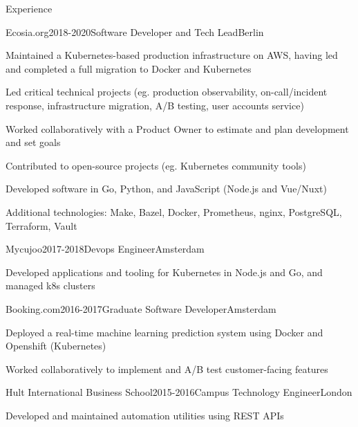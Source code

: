 \documentclass{resume} %
\begin{document}
\begin{rSection}{Experience}
\begin{rSubsection}{{Ecosia.org}}{2018-2020}{Software Developer and Tech Lead}{Berlin}
    \item Maintained a Kubernetes-based production infrastructure on AWS, having led and completed a full migration to Docker and Kubernetes
    \item Led critical technical projects (eg. production observability, on-call/incident response, infrastructure migration, A/B testing, user accounts service)
    \item Worked collaboratively with a Product Owner to estimate and plan development and set goals
    \item Contributed to open-source projects (eg. Kubernetes community tools)
    \item Developed software in Go, Python, and JavaScript (Node.js and Vue/Nuxt)
    \item Additional technologies: Make, Bazel, Docker, Prometheus, nginx, PostgreSQL, Terraform, Vault
\end{rSubsection}

\begin{rSubsection}{{Mycujoo}}{2017-2018}{Devops Engineer}{Amsterdam}
    \item Developed applications and tooling for Kubernetes in Node.js and Go, and managed k8s clusters
\end{rSubsection}

\begin{rSubsection}{{Booking.com}}{2016-2017}{Graduate Software Developer}{Amsterdam}
    \item Deployed a real-time machine learning prediction system using Docker and Openshift (Kubernetes)
    \item Worked collaboratively to implement and A/B test customer-facing features
\end{rSubsection}

\begin{rSubsection}{{Hult International Business School}}{2015-2016}{Campus Technology Engineer}{London}
    \item Developed and maintained automation utilities using REST APIs
\end{rSubsection}

\end{rSection}

\end{document}
